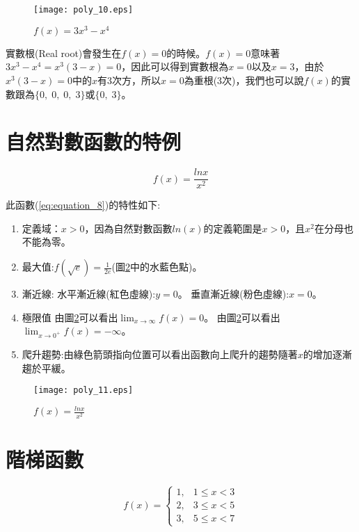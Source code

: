 \documentclass[12pt, a4paper]{article}
\begin{document}
\begin{figure}[H]
\centering
\texttt{[image: poly\_10.eps]}
\caption{$f(x) = 3x^3-x^4$}
\label{fig:poly_10.eps}
\end{figure} 

實數根(Real root)會發生在\;$f(x)=0$\;的時候。\;$f(x)=0$\;意味著\;$3x^3-x^4=x^3(3-x)=0$\;，因此可以得到實數根為\;$x=0$\;以及\;$x=3$\;，由於\;$x^3(3-x)=0$\;中的\;$x$\;有\;$3$\;次方，所以\;$x=0$\;為重根(3次)，我們也可以說\;$f(x)$\;的實數跟為\;$\{0,\;0,\;0,\;3\}$\;或\;$\{0,\;3\}$\;。

\section{自然對數函數的特例}
\begin{equation}\label{eq:equation_8}
f(x) = \frac{lnx}{x^2}
\end{equation}

此函數\;(\ref{eq:equation_8})\;的特性如下:
\begin{enumerate}
\item 定義域\;：\;$x>0$\;，因為自然對數函數\;$ln(x)$\;的定義範圍是\;$x>0$\;，且\;$x^2$\;在分母也不能為零。
\item 最大值\;:\;$f(\sqrt{e})= \frac{1}{2e}$\;(圖\;\ref{fig:poly_11.eps}\;中的水藍色點)。
\item 漸近線\;:
\subitem 水平漸近線(紅色虛線)\;:\;$y=0$\;。
\subitem 垂直漸近線(粉色虛線)\;:\;$x=0$\;。
\item 極限值
\subitem 由圖\;\ref{fig:poly_11.eps}\;可以看出\;$\lim_{x \rightarrow \infty} f(x)=0$\;。
\subitem 由圖\;\ref{fig:poly_11.eps}\;可以看出\;$\lim_{x \rightarrow 0^+} f(x)=-\infty$\;。
\item 爬升趨勢\;:\;由綠色箭頭指向位置可以看出函數向上爬升的趨勢隨著\;$x$\;的增加逐漸趨於平緩。
\end{enumerate}

\begin{figure}[H]
\centering
\texttt{[image: poly\_11.eps]}
\caption{$f(x) = \frac{lnx}{x^2}$}
\label{fig:poly_11.eps}
\end{figure} 

\section{階梯函數}
\begin{equation}\label{eq:equation_9}
f(x) =\begin{cases}1, & 1 \leq x < 3 \\2, &3 \leq x < 5 \\3, &5 \leq x < 7 \end{cases}
\end{equation} 
\end{document}
